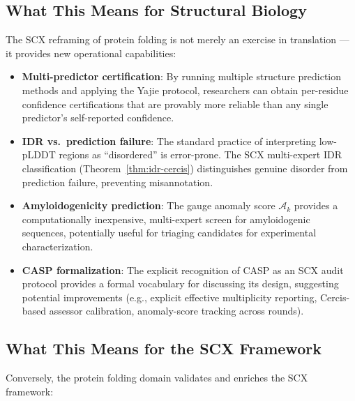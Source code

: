 \documentclass[12pt,a4paper]{article}
\theoremstyle{remark}
\begin{document}
\subsection{What This Means for Structural Biology}

The SCX reframing of protein folding is not merely an exercise in translation — it provides new operational capabilities:

\begin{itemize}[leftmargin=*]
    \item \textbf{Multi-predictor certification}: By running multiple structure prediction methods and applying the Yajie protocol, researchers can obtain per-residue confidence certifications that are provably more reliable than any single predictor's self-reported confidence.
    \item \textbf{IDR vs.\ prediction failure}: The standard practice of interpreting low-pLDDT regions as ``disordered'' is error-prone. The SCX multi-expert IDR classification (Theorem~\ref{thm:idr-cercis}) distinguishes genuine disorder from prediction failure, preventing misannotation.
    \item \textbf{Amyloidogenicity prediction}: The gauge anomaly score $\mathcal{A}_k$ provides a computationally inexpensive, multi-expert screen for amyloidogenic sequences, potentially useful for triaging candidates for experimental characterization.
    \item \textbf{CASP formalization}: The explicit recognition of CASP as an SCX audit protocol provides a formal vocabulary for discussing its design, suggesting potential improvements (e.g., explicit effective multiplicity reporting, Cercis-based assessor calibration, anomaly-score tracking across rounds).
\end{itemize}

\subsection{What This Means for the SCX Framework}

Conversely, the protein folding domain validates and enriches the SCX framework:
\end{document}
